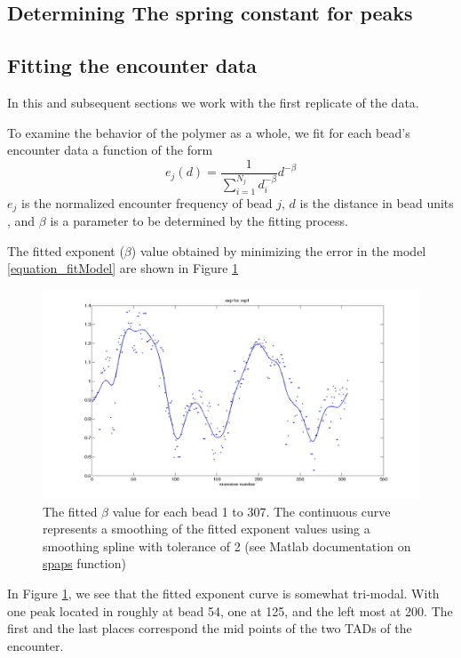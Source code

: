 \documentclass[12pt]{book}
\begin{document}
\subsection{Determining The spring constant for peaks} 

\subsection{Fitting the encounter data}\label{subsection_fittingTheEncounterData}
In this and subsequent sections we work with the first replicate of the data.

To examine the behavior of the polymer as a whole, we fit for each bead's encounter data 
a function of the form 
\begin{equation}\label{equation_fitModel}
e_j(d)= \frac{1}{\sum_{i=1}^{N_j}d_i^{-\beta}}d^{-\beta}
\end{equation}
$e_j$ is the normalized encounter frequency of bead $j$, $d$ is the distance in bead units , and $\beta$ is a parameter to be determined by the fitting process. 

The fitted exponent ($\beta$) value obtained by minimizing the error in the model \ref{equation_fitModel} are shown in Figure \ref{figure_fittedExpExperimentalData307Beads}
\begin{figure}[H]
\includegraphics[scale=0.15]{fittedExpValuesWithSplineRep1}
\caption{\scriptsize{The fitted $\beta$ value for each bead 1 to 307. The continuous curve represents a smoothing of the fitted exponent values using a smoothing spline with tolerance of 2 (see Matlab documentation on \href{http://www.mathworks.fr/fr/help/curvefit/spaps.html}{spaps} function)}}
\label{figure_fittedExpExperimentalData307Beads}
\end{figure}

In Figure \ref{figure_fittedExpExperimentalData307Beads}, we see that the fitted exponent curve is somewhat tri-modal. With one peak located in roughly at bead 54, one at 125, and the left most at 200. The first and the last places correspond the mid points of the two TADs of the encounter. 
\end{document}
